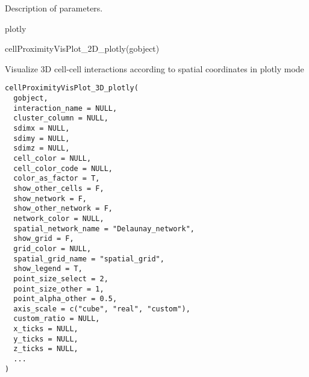 \documentclass[a4paper]{book}
\begin{document}
%
\begin{Details}\relax
Description of parameters.
\end{Details}
%
\begin{Value}
plotly
\end{Value}
%
\begin{Examples}
\begin{ExampleCode}
    cellProximityVisPlot_2D_plotly(gobject)
\end{ExampleCode}
\end{Examples}
%
\begin{Description}\relax
Visualize 3D cell-cell interactions according to spatial coordinates in plotly mode
\end{Description}
%
\begin{Usage}
\begin{verbatim}
cellProximityVisPlot_3D_plotly(
  gobject,
  interaction_name = NULL,
  cluster_column = NULL,
  sdimx = NULL,
  sdimy = NULL,
  sdimz = NULL,
  cell_color = NULL,
  cell_color_code = NULL,
  color_as_factor = T,
  show_other_cells = F,
  show_network = F,
  show_other_network = F,
  network_color = NULL,
  spatial_network_name = "Delaunay_network",
  show_grid = F,
  grid_color = NULL,
  spatial_grid_name = "spatial_grid",
  show_legend = T,
  point_size_select = 2,
  point_size_other = 1,
  point_alpha_other = 0.5,
  axis_scale = c("cube", "real", "custom"),
  custom_ratio = NULL,
  x_ticks = NULL,
  y_ticks = NULL,
  z_ticks = NULL,
  ...
)
\end{verbatim}
\end{Usage}
%
\end{document}
